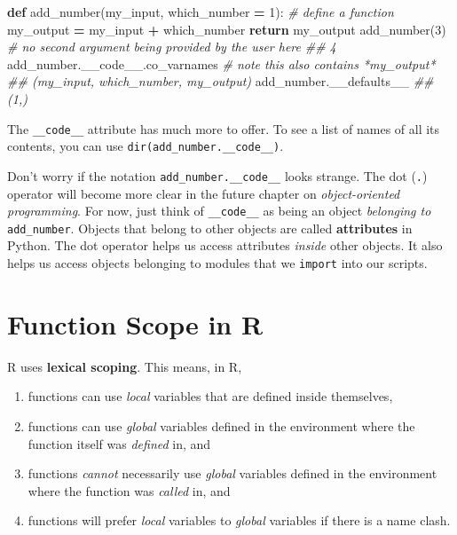 \documentclass[
  12pt,
  krantz2]{krantz}
\makeatletter
\newenvironment{Shaded}{\begin{snugshade}}{\end{snugshade}}
\newcommand{\CommentTok}[1]{\textcolor[rgb]{0.37,0.37,0.37}{\textit{#1}}}
\newcommand{\ControlFlowTok}[1]{\textcolor[rgb]{0.27,0.27,0.27}{\textbf{#1}}}
\newcommand{\DecValTok}[1]{\textcolor[rgb]{0.06,0.06,0.06}{#1}}
\newcommand{\KeywordTok}[1]{\textcolor[rgb]{0.27,0.27,0.27}{\textbf{#1}}}
\newcommand{\NormalTok}[1]{#1}
\newcommand{\OperatorTok}[1]{\textcolor[rgb]{0.43,0.43,0.43}{\textbf{#1}}}
\providecommand{\tightlist}{%
  \setlength{\itemsep}{0pt}\setlength{\parskip}{0pt}}
\newenvironment{kframe}{%
\medskip{}
\setlength{\fboxsep}{.8em}
 \def\at@end@of@kframe{}%
 \ifinner\ifhmode%
  \def\at@end@of@kframe{\end{minipage}}%
  \begin{minipage}{\columnwidth}%
 \fi\fi%
 \def\FrameCommand##1{\hskip\@totalleftmargin \hskip-\fboxsep
 \colorbox{shadecolor}{##1}\hskip-\fboxsep
     \hskip-\linewidth \hskip-\@totalleftmargin \hskip\columnwidth}%
 \MakeFramed {\advance\hsize-\width
   \@totalleftmargin\z@ \linewidth\hsize
   \@setminipage}}%
 {\par\unskip\endMakeFramed%
 \at@end@of@kframe}
\renewenvironment{Shaded}{\begin{kframe}}{\end{kframe}}
\makeatother
\begin{document}
\begin{Shaded}
\begin{Highlighting}[]
\KeywordTok{def}\NormalTok{ add\_number(my\_input, which\_number }\OperatorTok{=} \DecValTok{1}\NormalTok{): }\CommentTok{\# define a function}
\NormalTok{    my\_output }\OperatorTok{=}\NormalTok{ my\_input }\OperatorTok{+}\NormalTok{ which\_number}
    \ControlFlowTok{return}\NormalTok{ my\_output}
\NormalTok{add\_number(}\DecValTok{3}\NormalTok{) }\CommentTok{\# no second argument being provided by the user here}
\CommentTok{\#\# 4}
\NormalTok{add\_number.\_\_code\_\_.co\_varnames }\CommentTok{\# note this also contains *my\_output*}
\CommentTok{\#\# (\textquotesingle{}my\_input\textquotesingle{}, \textquotesingle{}which\_number\textquotesingle{}, \textquotesingle{}my\_output\textquotesingle{})}
\NormalTok{add\_number.\_\_defaults\_\_}
\CommentTok{\#\# (1,)}
\end{Highlighting}
\end{Shaded}

The \texttt{\_\_code\_\_} attribute has much more to offer. To see a list of names of all its contents, you can use \texttt{dir(add\_number.\_\_code\_\_)}.

\begin{rmd-details}
Don't worry if the notation \texttt{add\_number.\_\_code\_\_} looks strange. The dot (\texttt{.}) operator will become more clear in the future chapter on \emph{object-oriented programming}. For now, just think of \texttt{\_\_code\_\_} as being an object \emph{belonging to} \texttt{add\_number}. Objects that belong to other objects are called \textbf{attributes} in Python. The dot operator helps us access attributes \emph{inside} other objects. It also helps us access objects belonging to modules that we \texttt{import} into our scripts.

\end{rmd-details}

\hypertarget{function-scope-in-r}{%
\section{Function Scope in R}\label{function-scope-in-r}}

R uses \textbf{lexical scoping}. This means, in R,

\begin{enumerate}
\def\labelenumi{\arabic{enumi}.}
\tightlist
\item
  functions can use \emph{local} variables that are defined inside themselves,\\
\item
  functions can use \emph{global} variables defined in the environment where the function itself was \emph{defined} in, and
\item
  functions \emph{cannot} necessarily use \emph{global} variables defined in the environment where the function was \emph{called} in, and
\item
  functions will prefer \emph{local} variables to \emph{global} variables if there is a name clash.
\end{enumerate}
\end{document}
